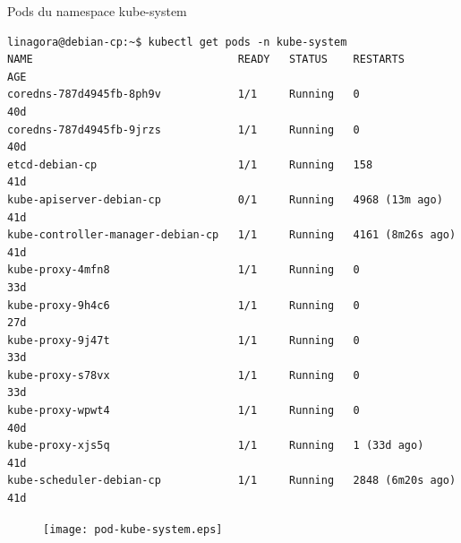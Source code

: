 \begin{frame}[fragile]{Pods du namespace kube-system}

\begin{tiny}
\begin{Verbatim}[commandchars=\\\{\}]
linagora@debian-cp:~$ kubectl get pods -n kube-system
NAME                                READY   STATUS    RESTARTS           AGE
coredns-787d4945fb-8ph9v            1/1     Running   0                  40d
coredns-787d4945fb-9jrzs            1/1     Running   0                  40d
etcd-debian-cp                      1/1     Running   158                41d
kube-apiserver-debian-cp            0/1     Running   4968 (13m ago)     41d
kube-controller-manager-debian-cp   1/1     Running   4161 (8m26s ago)   41d
kube-proxy-4mfn8                    1/1     Running   0                  33d
kube-proxy-9h4c6                    1/1     Running   0                  27d
kube-proxy-9j47t                    1/1     Running   0                  33d
kube-proxy-s78vx                    1/1     Running   0                  33d
kube-proxy-wpwt4                    1/1     Running   0                  40d
kube-proxy-xjs5q                    1/1     Running   1 (33d ago)        41d
kube-scheduler-debian-cp            1/1     Running   2848 (6m20s ago)   41d
\end{Verbatim}
\end{tiny}

\begin{figure}
\begin{center}
\texttt{[image: pod-kube-system.eps]}
\end{center}
\end{figure}

\end{frame}


